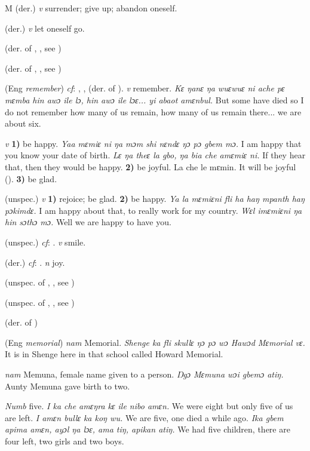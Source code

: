 \begin{letter}{M}
 (der.) \textit{v} surrender; give up; abandon oneself.

 (der.) \textit{v} let oneself go.

 (der. of , , see ) 

 (der. of , , see ) 

 (Eng \textit{remember}) \textit{cf}: , ,  (der. of ). \textit{v} remember. \textit{Kɛ ŋanɛ ŋa wuɛwuɛ ni ache pɛ mɛmba hin awɔ ile lɔ, hin awɔ ile lɔɛ... yi abaot amɛnbul.} But some have died so I do not remember how many of us remain, how many of us remain there... we are about six.

 \textit{v} \textbf{1)} be happy. \textit{Yaa mɛmiɛ ni ŋa mɔm shi nɛndɛ ŋɔ pɔ gbem mɔ.} I am happy that you know your date of birth. \textit{Lɛ ŋa theɛ la gbo, ŋa bia che amɛmiɛ ni.} If they hear that, then they would be happy. \textbf{2)} be joyful. La che le mɛmin. It will be joyful (\citealt{Pichl1967}). \textbf{3)} be glad.

 (unspec.) \textit{v} \textbf{1)} rejoice; be glad. \textbf{2)} be happy. \textit{Ya la mɛmiɛni fli ha haŋ mpanth haŋ pɔkimdɛ.} I am happy about that, to really work for my country. \textit{Wɛl imɛmiɛni ŋa hin sɔthɔ mɔ.} Well we are happy to have you.

 (unspec.) \textit{cf}: . \textit{v} smile.

 (der.) \textit{cf}: . \textit{n} joy.

 (unspec. of , , see ) 

 (unspec. of , , see ) 

 (der. of ) 

 (Eng \textit{memorial}) \textit{nam} Memorial. \textit{Shenge ka fli skullɛ ŋɔ pɔ wɔ Hawɔd Mɛmorial vɛ.} It is in Shenge here in that school called Howard Memorial.

 \textit{nam} Memuna, female name given to a person. \textit{Ŋgɔ Mɛmuna wɔi gbemɔ atiŋ.} Aunty Memuna gave birth to two.

 \textit{Numb} five. \textit{I ka che amɛŋra kɛ ile nibo amɛn.} We were eight but only five of us are left. \textit{I amɛn bullɛ ka koŋ wu.} We are five, one died a while ago. \textit{Ika gbem apima amɛn, ayɔl ŋa lɔɛ, ama tiŋ, apikan atiŋ.} We had five children, there are four left, two girls and two boys.


\end{letter}

